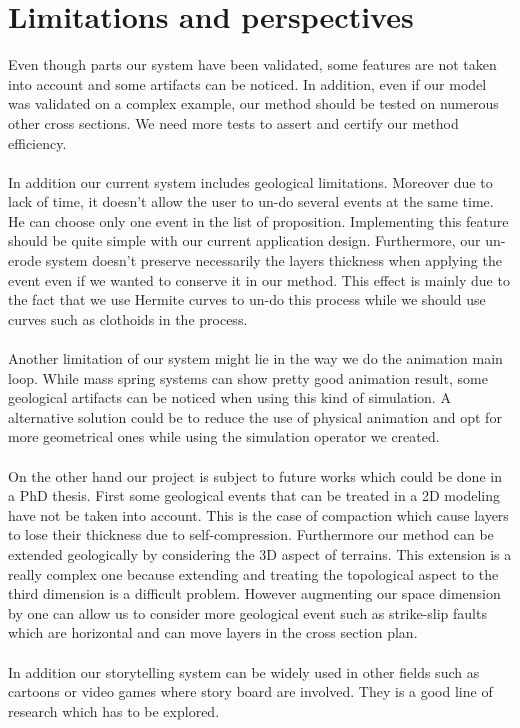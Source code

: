 \documentclass[12pt, a4paper]{report} %
\begin{document}
\chapter{Limitations and perspectives}

Even though parts our system have been validated, some features are not taken into account and some artifacts can be noticed. In addition, even if our model was validated on a complex example, our method should be tested on numerous other cross sections. We need more tests to assert and certify our method efficiency.\\\\
In addition our current system includes geological limitations. Moreover due to lack of time, it doesn't allow the user to un-do several events at the same time. He can choose only one event in the list of proposition. Implementing this feature should be quite simple with our current application design.
Furthermore, our un-erode system doesn't preserve necessarily the layers thickness when applying the event even if we wanted to conserve it in our method. This effect is mainly due to the fact that we use Hermite curves to un-do this process while we should use curves such as clothoids in the process.\\\\
Another limitation of our system might lie in the way we do the animation main loop. While mass spring systems can show pretty good animation result, some geological artifacts can be noticed when using this kind of simulation. A alternative solution could be to reduce the use of physical animation and opt for more geometrical ones while using the simulation operator we created.\\\\
On the other hand our project is subject to future works which could be done in a PhD thesis. 
First some geological events that can be treated in a 2D modeling have not be taken into account. This is the case of compaction which cause layers to lose their thickness due to self-compression. Furthermore our method can be extended geologically by considering the 3D aspect of terrains. This extension is a really complex one because extending and treating the topological aspect to the third dimension is a difficult problem. However augmenting our space dimension by one can allow us to consider more geological event such as strike-slip faults which are horizontal and can move layers in the cross section plan. \\\\
In addition our storytelling system can be widely used in other fields such as cartoons or video games where story board are involved. They is a good line of research which has to be explored.
\end{document}
